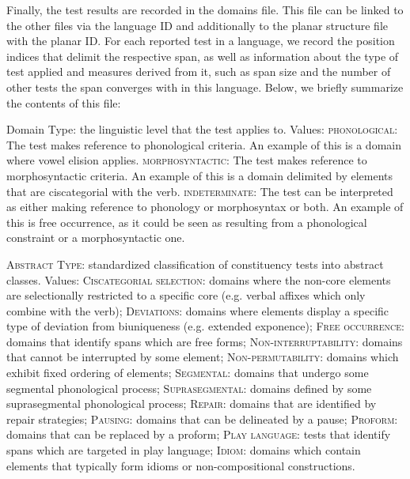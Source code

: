 \documentclass[output=paper,draftmode]{langscibook}
\begin{document}
Finally, the test results are recorded in the domains file. This file can be linked to the other files via the language ID and additionally to the planar structure file with the planar ID.
For each reported test in a language, we record the position indices that delimit the respective span, as well as information about the type of test applied and measures derived from it, such as span size and the number of other tests the span converges with in this language.
Below, we briefly summarize the contents of this file:

\ea Domain Type: the linguistic level that the test applies to. Values:
    \ea \textsc{phonological}: The test makes reference to phonological criteria. An example of this is a domain where vowel elision applies.
    \ex \textsc{morphosyntactic}: The test makes reference to morphosyntactic criteria. An example of this is a domain delimited by elements that are ciscategorial with the verb.
    \ex \textsc{indeterminate}: The test can be interpreted as either making reference to phonology or morphosyntax or both. An example of this is free occurrence, as it could be seen as resulting from a phonological constraint or a morphosyntactic one.
    \z 
\z


\ea \textsc{Abstract Type}: standardized classification of constituency tests into abstract classes. Values:
   \ea \textsc{Ciscategorial selection}: domains where the non-core elements are selectionally restricted to a specific core (e.g. verbal affixes which only combine with the verb);
    \ex \textsc{Deviations}: domains where elements display a specific type of deviation from biuniqueness (e.g. extended exponence);
    \ex \textsc{Free occurrence}: domains that identify spans which are free forms;
    \ex \textsc{Non-interruptability}: domains that cannot be interrupted by some element;
    \ex \textsc{Non-permutability}: domains which exhibit fixed ordering of elements;
    \ex \textsc{Segmental}: domains that undergo some segmental phonological process;
    \ex \textsc{Suprasegmental}: domains defined by some suprasegmental phonological process;
    \ex \textsc{Repair}: domains that are identified by repair strategies;
    \ex \textsc{Pausing}: domains that can be delineated by a pause;
    \ex \textsc{Proform}: domains that can be replaced by a proform;
    \ex \textsc{Play language}: tests that identify spans which are targeted in play language;
    \ex \textsc{Idiom}: domains which contain elements that typically form idioms or non-compositional constructions.
    \z
\z
\end{document}
